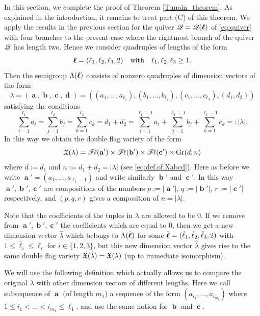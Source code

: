 \documentclass[12pt,reqno]{amsart}
\begin{document}
In this section, we complete the proof of Theorem \ref{T:main_theorem}. As explained in the introduction, it remains to treat part (C) of this theorem.
We apply the results in the previous section for the quiver $\mathscr{Q}=\mathscr{Q}(\boldsymbol{\ell})$ of \eqref{eq:quiver} with four branches
to the present case where the rightmost branch of the quiver $ \mathscr{Q} $ has length two.
Hence we consider quadruples of lengths of the form
$$
\boldsymbol{\ell}=(\ell_1,\ell_2,\ell_3,2)\quad\mbox{with}\quad\ell_1,\ell_2,\ell_3\geq 1.
$$
Then the semigroup $\Lambda(\boldsymbol{\ell})$ consists of nonzero quadruples of dimension vectors of the form
\begin{equation}\label{form-lambda}
\lambda=(\mbfa,\mbfb,\mbfc,\mbfd)=((a_1,\ldots,a_{\ell_1}),(b_1,\ldots,b_{\ell_2}),(c_1,\ldots,c_{\ell_3}),(d_1,d_2))
\end{equation}
satisfying the conditions
\begin{equation}
\label{condition-Lambda}
 \sum_{i=1}^{\ell_1}a_i=\sum_{j=1}^{\ell_2}b_j=\sum_{k=1}^{\ell_3}c_k=d_1+d_2=\sum_{i=1}^{\ell_1-1}a_i+\sum_{j=1}^{\ell_2-1}b_j+\sum_{k=1}^{\ell_3-1}c_k=:|\lambda|.
\end{equation}
In this way we obtain the double flag variety of the form
$$
\mathfrak{X}(\lambda)=\mathscr{F}\!\ell(\mathbf{a}')\times\mathscr{F}\!\ell(\mathbf{b}')\times\mathscr{F}\!\ell(\mathbf{c}')\times\mathrm{Gr}(d;n)
$$
where $d:=d_1$ and $n:=d_1+d_2=|\lambda|$ (see \eqref{eq:def.of.Xabcd}).
Here as before we write $\mbfa'=(a_1,\ldots,a_{\ell_1-1})$ and write similarly $\mbfb'$ and $\mbfc'$. In this way $\mbfa',\mbfb',\mbfc'$ are compositions of the numbers $p:=|\mbfa'|$, $q:=|\mbfb'|$, $r:=|\mbfc'|$ respectively,
and $ (p, q, r) $ gives a composition of $n=|\lambda|$.

Note that the coefficients of the tuples in $\lambda$ are allowed to be $0$. If we remove from $\mbfa',\mbfb',\mbfc'$ the coefficients which are equal to $0$, then we get a new dimension vector $\hat\lambda$ which belongs to $\Lambda(\hat{\boldsymbol{\ell}})$ for some $\hat{\boldsymbol{\ell}}=(\hat\ell_1,\hat\ell_2,\hat\ell_3,2)$ with $1\leq\hat\ell_i\leq\ell_i$ for $i\in\{1,2,3\}$,
but this new dimension vector $\hat\lambda$ gives rise to the same double flag variety $\mathfrak{X}(\hat\lambda)=\mathfrak{X}(\lambda)$ (up to immediate isomorphism).

We will use the following definition which actually allows us to compare the original $\lambda$ with other dimension vectors of different lengths. %
Here we call subsequence of $\mbfa$ (of length $m_1$) a sequence of the form $(a_{i_1},\ldots,a_{i_{m_1}})$ where $1\leq i_1<\ldots<i_{m_1}\leq \ell_1$, and use the same notion for $\mbfb$ and $\mbfc$.
\end{document}
